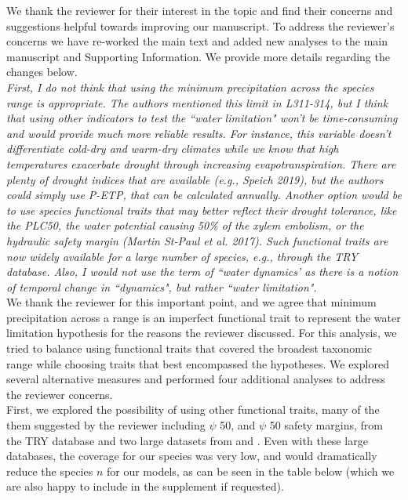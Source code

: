 \documentclass{article}[11pt]
\begin{document}
We thank the reviewer for their interest in the topic and find their concerns and suggestions helpful towards improving our manuscript. To address the reviewer's concerns we have re-worked the main text and added new analyses to the main manuscript and Supporting Information. We provide more details regarding the changes below.\\

\emph{First, I do not think that using the minimum precipitation across the species range is appropriate. The authors mentioned this limit in L311-314, but I think that using other indicators to test the ``water limitation" won't be time-consuming and would provide much more reliable results. For instance, this variable doesn't differentiate cold-dry and warm-dry climates while we know that high temperatures exacerbate drought through increasing evapotranspiration. There are plenty of drought indices that are available (e.g., Speich 2019), but the authors could simply use P-ETP, that can be calculated annually. Another option would be to use species functional traits that may better reflect their drought tolerance, like the PLC50, the water potential causing 50\% of the xylem embolism, or the hydraulic safety margin (Martin St-Paul et al. 2017). Such functional traits are now widely available for a large number of species, e.g., through the TRY database. Also, I would not use the term of ``water dynamics' as there is a notion of temporal change in ``dynamics", but rather ``water limitation".}\\

\noindent We thank the reviewer for this important point, and we agree that minimum precipitation across a range is an imperfect functional trait to represent the water limitation hypothesis for the reasons the reviewer discussed. For this analysis, we tried to balance using functional traits that covered the broadest taxonomic range while choosing traits that best encompassed the hypotheses. We explored several alternative measures and performed four additional analyses to address the reviewer concerns.\\

\noindent First, we explored the possibility of using other functional traits, many of the them suggested by the reviewer including $\psi$ 50, and $\psi$ 50 safety margins, from the TRY database and two large datasets from \citet{Bartlett2012} and \citet{Choat2012}. Even with these large databases, the coverage for our species was very low, and would dramatically reduce the species $n$ for our models, as can be seen in the table below (which we are also happy to include in the supplement if requested).\\
\end{document}
